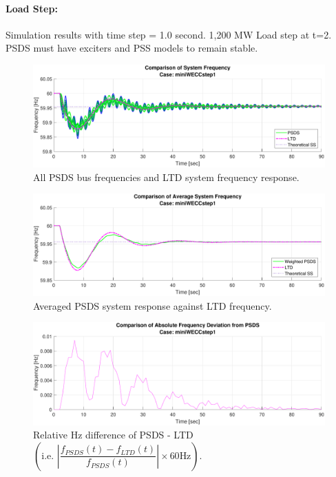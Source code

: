 \documentclass[12pt]{article}
\begin{document}
\paragraph{Load Step:}Simulation results with time step = 1.0 second. 1,200 MW Load step at t=2. PSDS must have exciters and PSS models to remain stable.

	\begin{figure}[h!]
			\centering
			\includegraphics[width=\linewidth]{miniWECCstep1Freq}\vspace{-1em}
			\caption{All PSDS bus frequencies and LTD system frequency response.}
			\label{fcomp}		 
	\end{figure}\vspace{-2em}
	\begin{figure}[h!]
				\centering
				\includegraphics[width=\linewidth]{miniWECCstep1AveF}  \vspace{-2em}
				\caption{Averaged PSDS system response against LTD frequency.} 
				\label{aveF}
	\end{figure}\vspace{-2em}
	\begin{figure}[h!]	
				\centering
				\includegraphics[width=\linewidth]{miniWECCstep1RelF}  \vspace{-1.5em}
				\caption{Relative Hz difference of PSDS - LTD $\left( \text{i.e. }  \left|\dfrac{f_{PSDS}(t)- f_{LTD}(t)}{f_{PSDS}(t)}\right| \times 60 \text{Hz} \right)$.}
				\label{redDif}
	\end{figure}
\end{document}
